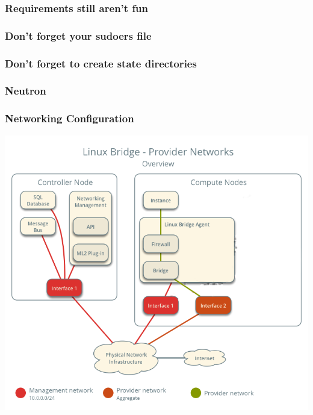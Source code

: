 \documentclass[aspectratio=169,11pt,hyperref={colorlinks=true}]{beamer}
\begin{document}
\begin{frame}
    \frametitle{Requirements still aren't fun}
    
\end{frame}

\begin{frame}
    \frametitle{Don't forget your sudoers file}
    
\end{frame}

\begin{frame}
    \frametitle{Don't forget to create state directories}
    
\end{frame}

\subsubsection{Neutron}
\begin{frame}
    \frametitle{Networking Configuration}
    \centering
    \includegraphics[width=.7\textwidth]{network-topology.png}
\end{frame}
\end{document}
